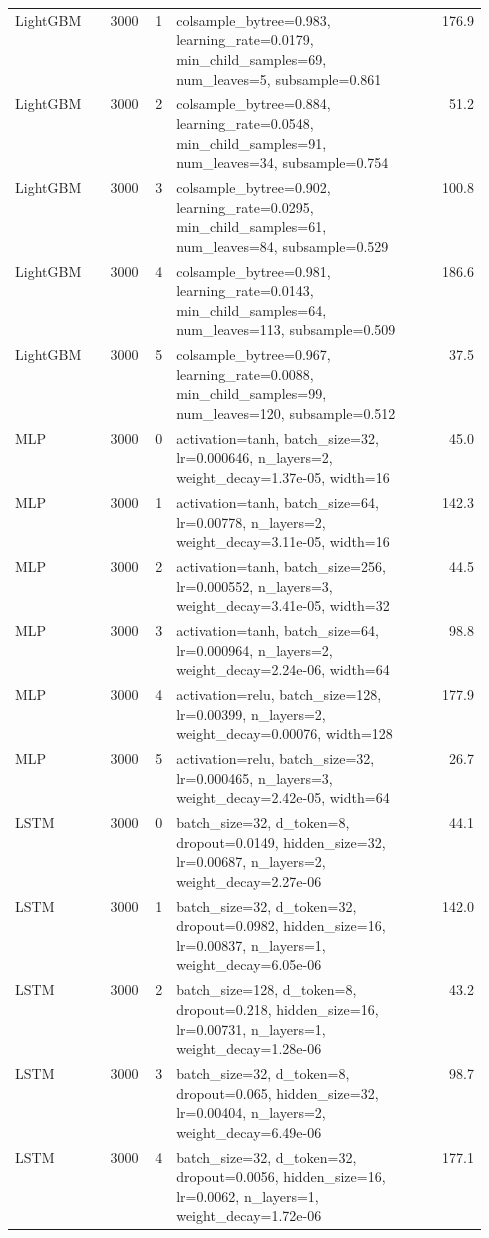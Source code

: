 \begin{longtable}{lrrp{0.55\linewidth}r}
LightGBM & 3000 & 1 & colsample\_bytree=0.983, learning\_rate=0.0179, min\_child\_samples=69, num\_leaves=5, subsample=0.861 & 176.9 \\
LightGBM & 3000 & 2 & colsample\_bytree=0.884, learning\_rate=0.0548, min\_child\_samples=91, num\_leaves=34, subsample=0.754 & 51.2 \\
LightGBM & 3000 & 3 & colsample\_bytree=0.902, learning\_rate=0.0295, min\_child\_samples=61, num\_leaves=84, subsample=0.529 & 100.8 \\
LightGBM & 3000 & 4 & colsample\_bytree=0.981, learning\_rate=0.0143, min\_child\_samples=64, num\_leaves=113, subsample=0.509 & 186.6 \\
LightGBM & 3000 & 5 & colsample\_bytree=0.967, learning\_rate=0.0088, min\_child\_samples=99, num\_leaves=120, subsample=0.512 & 37.5 \\
MLP & 3000 & 0 & activation=tanh, batch\_size=32, lr=0.000646, n\_layers=2, weight\_decay=1.37e-05, width=16 & 45.0 \\
MLP & 3000 & 1 & activation=tanh, batch\_size=64, lr=0.00778, n\_layers=2, weight\_decay=3.11e-05, width=16 & 142.3 \\
MLP & 3000 & 2 & activation=tanh, batch\_size=256, lr=0.000552, n\_layers=3, weight\_decay=3.41e-05, width=32 & 44.5 \\
MLP & 3000 & 3 & activation=tanh, batch\_size=64, lr=0.000964, n\_layers=2, weight\_decay=2.24e-06, width=64 & 98.8 \\
MLP & 3000 & 4 & activation=relu, batch\_size=128, lr=0.00399, n\_layers=2, weight\_decay=0.00076, width=128 & 177.9 \\
MLP & 3000 & 5 & activation=relu, batch\_size=32, lr=0.000465, n\_layers=3, weight\_decay=2.42e-05, width=64 & 26.7 \\
LSTM & 3000 & 0 & batch\_size=32, d\_token=8, dropout=0.0149, hidden\_size=32, lr=0.00687, n\_layers=2, weight\_decay=2.27e-06 & 44.1 \\
LSTM & 3000 & 1 & batch\_size=32, d\_token=32, dropout=0.0982, hidden\_size=16, lr=0.00837, n\_layers=1, weight\_decay=6.05e-06 & 142.0 \\
LSTM & 3000 & 2 & batch\_size=128, d\_token=8, dropout=0.218, hidden\_size=16, lr=0.00731, n\_layers=1, weight\_decay=1.28e-06 & 43.2 \\
LSTM & 3000 & 3 & batch\_size=32, d\_token=8, dropout=0.065, hidden\_size=32, lr=0.00404, n\_layers=2, weight\_decay=6.49e-06 & 98.7 \\
LSTM & 3000 & 4 & batch\_size=32, d\_token=32, dropout=0.0056, hidden\_size=16, lr=0.0062, n\_layers=1, weight\_decay=1.72e-06 & 177.1 \\

\end{longtable}

